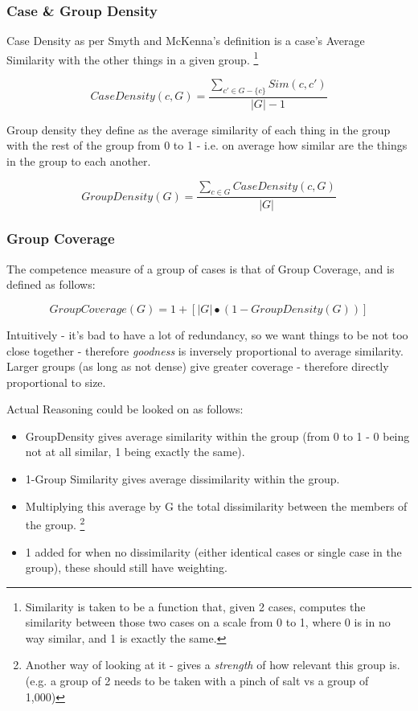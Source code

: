 \documentclass[a4paper,11pt]{report}
\begin{document}
\subsubsection{Case \& Group Density}

Case Density as per Smyth and McKenna's definition is a case's Average Similarity with the other things in a given group. \footnote{Similarity is taken to be a function that, given 2 cases, computes the similarity between those two cases on a scale from 0 to 1, where 0 is in no way similar, and 1 is exactly the same.}

\[
CaseDensity(c,G)=\frac{\underset{c'\in G-\{c\}}{\sum}Sim(c,c')}{\left|G\right|-1}
\]

Group density they define as the average similarity of each thing in the group with the rest of the group from 0 to 1 - i.e. on average how similar are the things in the group to each another.

\[
GroupDensity(G)=\frac{\underset{c\in G}{\sum}CaseDensity(c,G)}{\left|G\right|}
\]

\subsubsection{Group Coverage}
The competence measure of a group of cases is that of Group Coverage, and is defined as follows:

\[
GroupCoverage(G)=1+\left[\left|G\right|\bullet(1-GroupDensity(G))\right]
\]

Intuitively - it's bad to have a lot of redundancy, so we want things to be not too close together - therefore \emph{goodness} is inversely proportional to average similarity. Larger groups (as long as not dense) give greater coverage - therefore directly proportional to size.

Actual Reasoning could be looked on as follows:
\begin{itemize}
	\item GroupDensity gives average similarity within the group (from 0 to 1 - 0 being not at all similar, 1 being exactly the same).
	\item 1-Group Similarity gives average dissimilarity within the group.
	\item Multiplying this average by G the total dissimilarity between the members of the group. \footnote{Another way of looking at it - gives a \emph{strength} of how relevant this group is. (e.g. a group of 2 needs to be taken with a pinch of salt vs a group of 1,000)}
	\item 1 added for when no dissimilarity (either identical cases or single case in the group), these should still have weighting.
\end{itemize}
\end{document}

